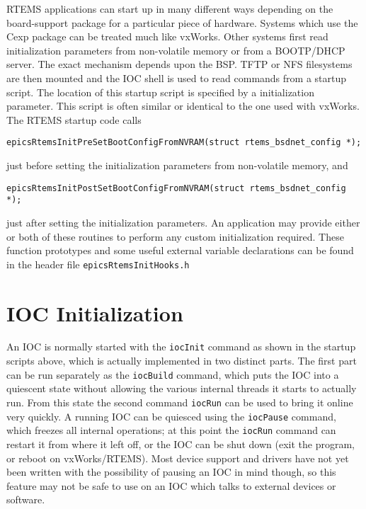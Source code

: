 RTEMS applications can start up in many different ways depending on the board-support package for a particular piece of hardware.
Systems which use the Cexp package can be treated much like vxWorks.
Other systems first read initialization parameters from non-volatile memory or from a BOOTP/DHCP server.
The exact mechanism depends upon the BSP.
TFTP or NFS filesystems are then mounted and the IOC shell is used to read commands from a startup script.
The location of this startup script is specified by a initialization parameter.
This script is often similar or identical to the one used with vxWorks.
The RTEMS startup code calls

\begin{verbatim}
epicsRtemsInitPreSetBootConfigFromNVRAM(struct rtems_bsdnet_config *);
\end{verbatim}

just before setting the initialization parameters from non-volatile memory, and

\begin{verbatim}
epicsRtemsInitPostSetBootConfigFromNVRAM(struct rtems_bsdnet_config *);
\end{verbatim}

just after setting the initialization parameters.
An application may provide either or both of these routines to perform any custom initialization required.
These function prototypes and some useful external variable declarations can be found in the header file \verb|epicsRtemsInitHooks.h|

\section{IOC Initialization}

An IOC is normally started with the \verb|iocInit| command as shown in the startup scripts above, which is actually implemented in two distinct parts.
The first part can be run separately as the \verb|iocBuild| command, which puts the IOC into a quiescent state without allowing the various internal threads it starts to actually run.
From this state the second command \verb|iocRun| can be used to bring it online very quickly.
A running IOC can be quiesced using the \verb|iocPause| command, which freezes all internal operations; at this point the \verb|iocRun| command can restart it from where it left off, or the IOC can be shut down (exit the program, or reboot on vxWorks/RTEMS).
Most device support and drivers have not yet been written with the possibility of pausing an IOC in mind though, so this feature may not be safe to use on an IOC which talks to external devices or software.

